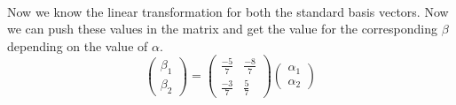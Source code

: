 \documentclass[a4paper,12pt,reqno,oneside]{amsart}
\theoremstyle{plain}
\numberwithin{equation}{section}
\begin{document}
\\
Now we know the linear transformation for both the standard basis vectors. Now we can push these values in the matrix and get the value for the corresponding $\beta$ depending on the value of $\alpha$.
$$
\begin{pmatrix}
    \beta_1 \\
    \beta_2
\end{pmatrix} = \begin{pmatrix}
    \frac{-5}{7} & \frac{-8}{7} \\
    \frac{-3}{7} & \frac{5}{7}
\end{pmatrix} \begin{pmatrix}
    \alpha_1 \\
    \alpha_2
\end{pmatrix}
$$






\end{document}
